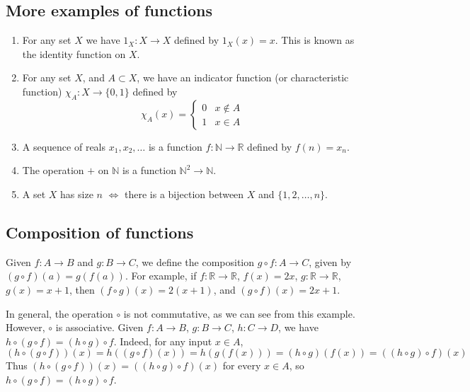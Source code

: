\subsection{More examples of functions}
\begin{enumerate}
	\item For any set \(X\) we have \(1_X\colon X \to X\) defined by \(1_X(x) = x\).
	      This is known as the identity function on \(X\).
	\item For any set \(X\), and \(A \subset X\), we have an indicator function (or characteristic function) \(\chi_A\colon X \to \{ 0, 1 \}\) defined by
	      \[
		      \chi_A(x) = \begin{cases}
			      0 & x \notin A \\
			      1 & x \in A
		      \end{cases}
	      \]
	\item A sequence of reals \(x_1, x_2, \dots\) is a function \(f\colon \mathbb N \to \mathbb R\) defined by \(f(n) = x_n\).
	\item The operation \(+\) on \(\mathbb N\) is a function \(\mathbb N^2 \to \mathbb N\).
	\item A set \(X\) has size \(n\) \(\iff\) there is a bijection between \(X\) and \(\{ 1, 2, \dots, n \}\).
\end{enumerate}

\subsection{Composition of functions}
Given \(f\colon A \to B\) and \(g\colon B \to C\), we define the composition \(g\circ f \colon A \to C\), given by \((g\circ f)(a) = g(f(a))\).
For example, if \(f\colon \mathbb R \to \mathbb R\), \(f(x) = 2x\), \(g\colon \mathbb R \to \mathbb R\), \(g(x) = x+1\), then \((f \circ g)(x) = 2(x+1)\), and \((g \circ f)(x) = 2x + 1\).

In general, the operation \(\circ\) is not commutative, as we can see from this example.
However, \(\circ\) is associative.
Given \(f\colon A \to B\), \(g\colon B \to C\), \(h\colon C \to D\), we have \(h \circ (g \circ f) = (h \circ g) \circ f\).
Indeed, for any input \(x \in A\),
\[
	(h \circ (g \circ f))(x) = h((g \circ f)(x)) = h(g(f(x))) = (h \circ g)(f(x)) = ((h \circ g)\circ f)(x)
\]
Thus \((h \circ (g \circ f))(x) = ((h \circ g)\circ f)(x)\) for every \(x \in A\), so \(h \circ (g \circ f) = (h \circ g)\circ f\).
